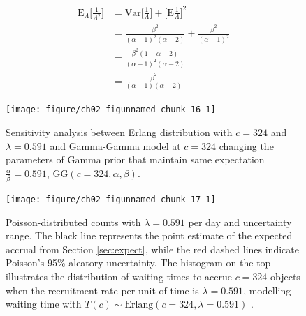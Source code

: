 \begin{align*}
\textrm{E}_{\Lambda}\Bigg [\frac{1}{\Lambda^2}\Bigg ] &= \textrm{Var}\Bigg [\frac{1}{\Lambda}\Bigg ] + \Bigg [\textrm{E}\frac{1}{\Lambda}\Bigg ]^2\\
&=\frac{\beta^2}{(\alpha-1)^2(\alpha-2)} + \frac{\beta^2}{(\alpha-1)^2}\\
&=\frac{\beta^2(1+\alpha-2)}{(\alpha-1)^2(\alpha-2)}\\
&=\frac{\beta^2}{(\alpha-1)(\alpha-2)}
\end{align*}

\begin{figure}
\begin{knitrout}
\color{fgcolor}

{\centering \texttt{[image: figure/ch02\_figunnamed-chunk-16-1]} 

}


\end{knitrout}
	\caption{Sensitivity analysis between Erlang distribution with $c = 324$ and $\lambda = 0.591$ and Gamma-Gamma model at $c = 324$ changing the parameters of Gamma prior that maintain same expectation $\frac{\alpha}{\beta} = 0.591$, $\textrm{GG}(c=324,\alpha, \beta)$.}
  \label{fig:2_6a}
\end{figure}



\begin{figure}
\begin{knitrout}
\color{fgcolor}

{\centering \texttt{[image: figure/ch02\_figunnamed-chunk-17-1]} 

}


\end{knitrout}
  \caption{Poisson-distributed counts with $\lambda = 0.591$ per day and uncertainty range. The black line represents the point estimate of the expected accrual from Section \ref{sec:expect}, while the red dashed lines indicate Poisson's 95\% aleatory uncertainty. The histogram on the top illustrates the distribution of waiting times to accrue $c=324$ objects when the recruitment rate per unit of time is $\lambda = 0.591$, modelling waiting time with $T(c)\sim \textrm{Erlang} (c=324, \lambda = 0.591)$ \citep{spiegelhalter2011visualizing, pkgacc}.}
  \label{fig:2_13}
\end{figure}


